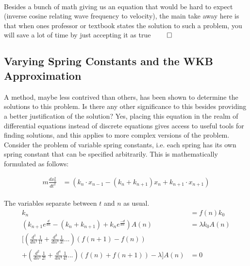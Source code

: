\documentclass{article}
\begin{document}
	\paragraph{}
		Besides a bunch of math giving us an equation that would be hard to expect (inverse cosine relating wave frequency to velocity), the main take away here is that when ones professor or textbook states the solution to such a problem, you will save a lot of time by just accepting it as true $\qed$

\subsection{Varying Spring Constants and the WKB Approximation}

\paragraph{}
	A method, maybe less contrived than others, has been shown to determine the solutions to this problem. Is there any other significance to this besides providing a better justification of the solution? Yes, placing this equation in the realm of differential equations instead of discrete equations gives access to useful tools for finding solutions, and this applies to more complex versions of the problem. Consider the problem of variable spring constants, i.e. each spring has its own spring constant that can be specified arbitrarily. This is mathematically formulated as follows:
	
\begin{align}
	m\frac{dx_{n}^{2}}{dt^{2}} &= (k_{n} \cdot x_{n - 1} - (k_{n} + k_{n + 1})x_{n} + k_{n + 1} \cdot x_{n + 1})	
\end{align}

\paragraph{}
	The variables separate between $t$ and $n$ as usual.
\begin{align}
			k_{n} &= f(n) k_{0}	\\
			 (k_{n + 1}e^{\frac{d}{dn}} - (k_{n} + k_{n + 1}) + k_{n}e^{\frac{-d}{dn}})A(n)  &= \lambda k_{0} A(n)\\
			 [( \frac{d^{1}}{dn^{1}}\frac{1}{1!} + \frac{d^{3}}{dn^{3}}\frac{1}{3!} ...) (f(n + 1) - f(n))\\ + ( \frac{d^{2}}{dn^{2}}\frac{1}{2!} + \frac{d^{4}}{dn^{4}}\frac{1}{4!} ...) (f(n) + f(n + 1)) - \lambda ]A(n) &= 0
\end{align}
\end{document}
